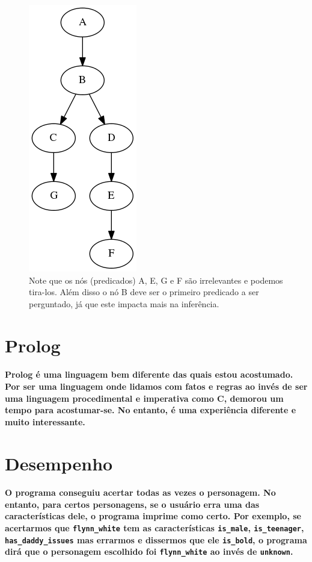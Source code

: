 \documentclass[a4paper,10pt]{article}
\theoremstyle{plain}
\begin{document}
\begin{figure}[h]
  \centering \includegraphics[scale=0.4]{imgs/tree1.png}
  \caption{Note que os nós (predicados) A, E, G e F são irrelevantes e podemos tira-los. Além disso
  o nó B deve ser o primeiro predicado a ser perguntado, já que este impacta mais na inferência.}
\end{figure}

\section{Prolog}

\paragraph{
  Prolog é uma linguagem bem diferente das quais estou acostumado. Por ser uma linguagem onde lidamos
  com fatos e regras ao invés de ser uma linguagem procedimental e imperativa como C, demorou um
  tempo para acostumar-se. No entanto, é uma experiência diferente e muito interessante.
}

\section{Desempenho}

\paragraph{
  O programa conseguiu acertar todas as vezes o personagem. No entanto, para certos personagens,
  se o usuário erra uma das características dele, o programa imprime como certo. Por exemplo, se
  acertarmos que \texttt{flynn\_white} tem as características \texttt{is\_male}, \texttt{is\_teenager},
  \texttt{has\_daddy\_issues} mas errarmos e dissermos que ele \texttt{is\_bold}, o programa dirá
  que o personagem escolhido foi \texttt{flynn\_white} ao invés de \texttt{unknown}.
}
\end{document}
